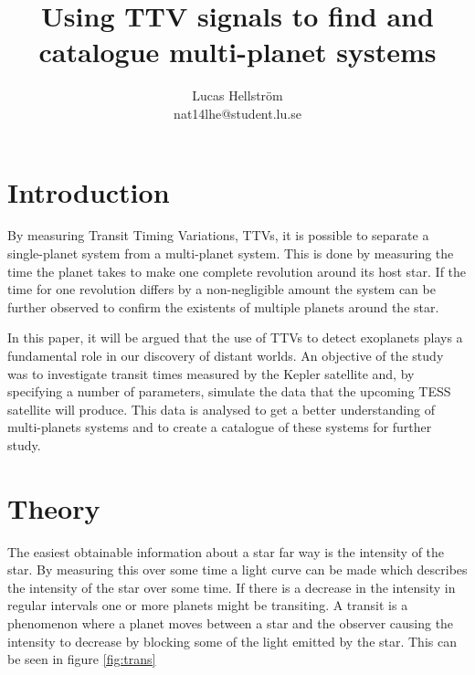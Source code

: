 \documentclass[titlepage]{article}
\title{Using TTV signals to find and catalogue multi-planet systems}
\author{Lucas Hellström\\ \small{nat14lhe@student.lu.se}}
\date{}
\begin{document}
\maketitle

\section{Introduction}
	By measuring Transit Timing Variations, TTVs, it is possible to separate a single-planet system from a multi-planet system. This is done by measuring the time the planet takes to make one complete revolution around its host star. If the time for one revolution differs by a non-negligible amount the system can be further observed to confirm the existents of multiple planets around the star. 
	
	In this paper, it will be argued that the use of TTVs to detect exoplanets plays a fundamental role in our discovery of distant worlds. An objective of the study was to investigate transit times measured by the Kepler satellite and, by specifying a number of parameters, simulate the data that the upcoming TESS satellite will produce. This data is analysed to get a better understanding of multi-planets systems and to create a catalogue of these systems for further study. 
	
	
\section{Theory}
	The easiest obtainable information about a star far way is the intensity of the star. By measuring this over some time a light curve can be made which describes the intensity of the star over some time. If there is a decrease in the intensity in regular intervals one or more planets might be transiting. A transit is a phenomenon where a planet moves between a star and the observer causing the intensity to decrease by blocking some of the light emitted by the star. This can be seen in figure \ref{fig:trans}
	
\end{document}
